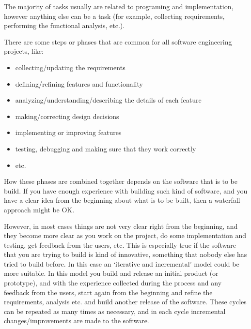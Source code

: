 \documentclass[11pt]{article}
\begin{document}
  The majority of tasks usually are related to programing and
  implementation, however anything else can be a task (for example,
  collecting requirements, performing the functional analysis, etc.).

  There are some steps or phases that are common for all software
  engineering projects, like:
\begin{itemize}
\item collecting/updating the requirements
\item defining/refining features and functionality
\item analyzing/understanding/describing the details of each feature
\item making/correcting design decisions
\item implementing or improving features
\item testing, debugging and making sure that they work correctly
\item etc.
\end{itemize}

  How these phases are combined together depends on the software that
  is to be build. If you have enough experience with building such
  kind of software, and you have a clear idea from the beginning about
  what is to be built, then a waterfall approach might be OK.

  However, in most cases things are not very clear right from the
  beginning, and they become more clear as you work on the project, do
  some implementation and testing, get feedback from the users,
  etc. This is especially true if the software that you are trying to
  build is kind of innovative, something that nobody else has tried to
  build before. In this case an `iterative and incremental' model could
  be more suitable. In this model you build and release an initial
  product (or prototype), and with the experience collected during the
  process and any feedback from the users, start again from the
  beginning and refine the requirements, analysis etc. and build
  another release of the software. These cycles can be repeated as
  many times as necessary, and in each cycle incremental
  changes/improvements are made to the software.
\end{document}
